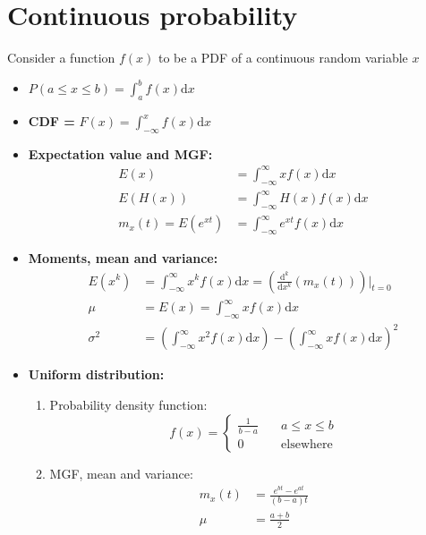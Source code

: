 \documentclass[a4paper]{article}
\begin{document}
\section{Continuous probability}
Consider a function $f(x)$ to be a PDF of a continuous random variable $x$
\begin{itemize}
    \item $P(a\leq x\leq b) = \int_{a}^{b}f(x)\mathrm{d}x$
    \item \textbf{CDF = }$F(x) = \int_{-\infty}^{x}f(x)\mathrm{d}x$
    \item \textbf{Expectation value and MGF:}
    \begin{align*}
    E(x) &= \int_{-\infty}^{\infty}xf(x)\mathrm{d}x\\
    E(H(x)) &= \int_{-\infty}^{\infty}H(x)f(x)\mathrm{d}x\\
    m_x(t) = E(e^{xt}) &= \int_{-\infty}^{\infty} e^{xt}f(x)\mathrm{d}x
    \end{align*}
    \item \textbf{Moments, mean and variance:}
    \begin{align*}
        E(x^k) &= \int_{-\infty}^{\infty} x^kf(x)\mathrm{d}x = \left(\frac{\mathrm{d}^k}{\mathrm{d}x^k}\left(m_x(t)\right)\right)\biggr\rvert_{t = 0}\\
        \mu &= E(x) = \int_{-\infty}^{\infty} xf(x)\mathrm{d}x\\
        \sigma^2 &= \left(\int_{-\infty}^{\infty} x^2f(x)\mathrm{d}x\right) - \left(\int_{-\infty}^{\infty} xf(x)\mathrm{d}x\right)^2
    \end{align*}
    \item \textbf{Uniform distribution:\\ }
    \begin{enumerate}
        \item Probability density function:
                \begin{equation*}
                    f(x) = \begin{cases}
                    \frac{1}{b-a}\quad & a\leq x\leq b\\
                    0\quad &\text{elsewhere}
                    \end{cases}
                \end{equation*}
        \item MGF, mean and variance:
    \begin{align*}
        m_x(t) &= \frac{e^{bt}-e^{at}}{(b-a)t}\\
        \mu &= \frac{a+b}{2}\\

\end{align*}
\end{enumerate}
\end{itemize}
\end{document}
